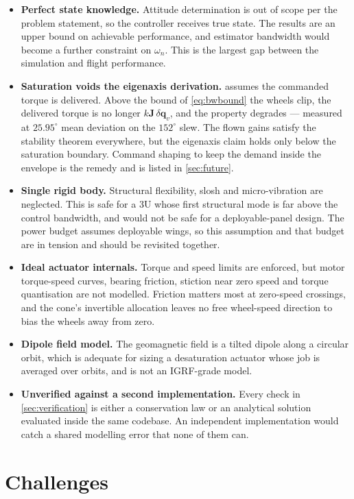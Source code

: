 \documentclass[conference,10pt,a4paper]{IEEEtran}
\newcommand{\vect}[1]{\bm{#1}}
\newcommand{\mat}[1]{\bm{#1}}
\begin{document}
\begin{itemize}
\item \textbf{Perfect state knowledge.} Attitude determination is out of scope
per the problem statement, so the controller receives true state. The results
are an upper bound on achievable performance, and estimator bandwidth would
become a further constraint on $\omega_n$. This is the largest gap between the
simulation and flight performance.
\item \textbf{Saturation voids the eigenaxis derivation.} 
assumes the commanded torque is delivered. Above the bound of
\cref{eq:bwbound} the wheels clip, the delivered torque is no longer
$k\mat{J}\,\delta\vect{q}_v$, and the property degrades --- measured at
$25.95^\circ$ mean deviation on the $152^\circ$ slew. The flown gains satisfy
the stability theorem everywhere, but the eigenaxis claim holds only below the
saturation boundary. Command shaping to keep the demand inside the envelope is
the remedy and is listed in \cref{sec:future}.
\item \textbf{Single rigid body.} Structural flexibility, slosh and
micro-vibration are neglected. This is safe for a 3U whose first structural
mode is far above the control bandwidth, and would not be safe for a
deployable-panel design. The power budget assumes deployable wings, so this
assumption and that budget are in tension and should be revisited together.
\item \textbf{Ideal actuator internals.} Torque and speed limits are enforced,
but motor torque-speed curves, bearing friction, stiction near zero speed and
torque quantisation are not modelled. Friction matters most at zero-speed
crossings, and the cone's invertible allocation leaves no free wheel-speed
direction to bias the wheels away from zero.
\item \textbf{Dipole field model.} The geomagnetic field is a tilted dipole
along a circular orbit, which is adequate for sizing a desaturation actuator
whose job is averaged over orbits, and is not an IGRF-grade model.
\item \textbf{Unverified against a second implementation.} Every check in
\cref{sec:verification} is either a conservation law or an analytical solution
evaluated inside the same codebase. An independent implementation would catch a
shared modelling error that none of them can.
\end{itemize}

\section{Challenges}
\label{sec:challenges}
\end{document}
